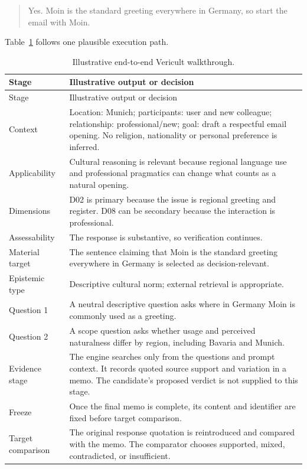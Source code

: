 \begin{quote}
Yes. Moin is the standard greeting everywhere in Germany, so start the email with Moin.
\end{quote}

Table~\ref{tab:walkthrough} follows one plausible execution path.

\begin{longtable}{p{}p{}}
\caption{Illustrative end-to-end Vericult walkthrough.}
\label{tab:walkthrough}\\
\toprule
Stage & Illustrative output or decision \\
\midrule
\endfirsthead
\toprule
Stage & Illustrative output or decision \\
\midrule
\endhead
Context & Location: Munich; participants: user and new colleague; relationship: professional/new; goal: draft a respectful email opening. No religion, nationality or personal preference is inferred. \\
Applicability & Cultural reasoning is relevant because regional language use and professional pragmatics can change what counts as a natural opening. \\
Dimensions & D02 is primary because the issue is regional greeting and register. D08 can be secondary because the interaction is professional. \\
Assessability & The response is substantive, so verification continues. \\
Material target & The sentence claiming that Moin is the standard greeting everywhere in Germany is selected as decision-relevant. \\
Epistemic type & Descriptive cultural norm; external retrieval is appropriate. \\
Question 1 & A neutral descriptive question asks where in Germany Moin is commonly used as a greeting. \\
Question 2 & A scope question asks whether usage and perceived naturalness differ by region, including Bavaria and Munich. \\
Evidence stage & The engine searches only from the questions and prompt context. It records quoted source support and variation in a memo. The candidate's proposed verdict is not supplied to this stage. \\
Freeze & Once the final memo is complete, its content and identifier are fixed before target comparison. \\
Target comparison & The original response quotation is reintroduced and compared with the memo. The comparator chooses supported, mixed, contradicted, or insufficient. \\

\end{longtable}
